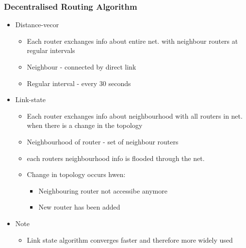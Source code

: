 \documentclass[a4paper]{article}
\begin{document}
\subsubsection{Decentralised Routing Algorithm}
	\begin{itemize}
		\item Distance-vecor
		\begin{itemize}
			\item Each router exchanges info about entire net. with
				neighbour routers at regular intervals
			\item Neighbour - connected by direct link
			\item Regular interval - every 30 seconds
		\end{itemize}
		\item Link-state
		\begin{itemize}
			\item Each router exchanges info about neighbourhood
				with all routers in net. when there is a change
				in the topology
			\item Neighbourhood of router - set of neighbour routers
			\item each routers neighbourhood info is flooded through
				the net.
			\item Change in topology occurs hwen:
			\begin{itemize}
				\item Neighbouring router not accessibe anymore
				\item New router has been added
			\end{itemize}
		\end{itemize}
		\item Note
		\begin{itemize}
			\item Link state algorithm converges faster and
				therefore more widely used
		\end{itemize}
	\end{itemize}
\end{document}

